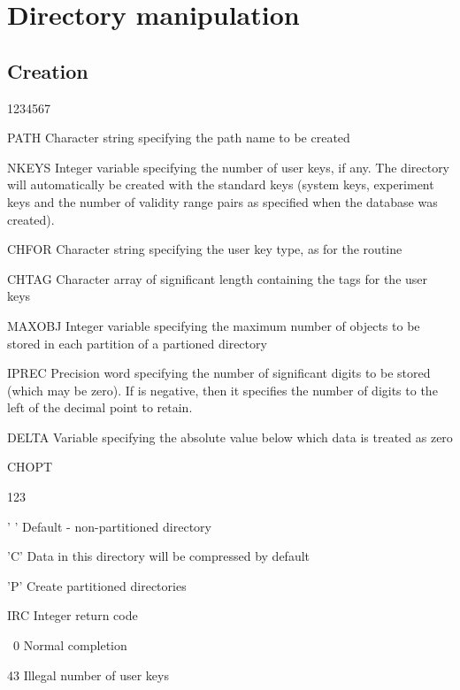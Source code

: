 \section{Directory manipulation}

\subsection{Creation}


\begin{DLtt}{1234567}
\item[PATH]Character string specifying the path name
  to be created
\item[NKEYS]Integer variable specifying the number of user
  keys, if any. The directory will automatically be created
  with the standard keys (system keys, experiment keys and
  the number of validity range pairs as specified when the
  database was created).
\item[CHFOR]Character string specifying the user key type,
  as for the routine 
\item[CHTAG]Character array of significant length  containing
  the tags for the user keys
\item[MAXOBJ]Integer variable specifying the maximum number of
  objects to be stored in each partition of a partioned directory
\item[IPREC]Precision word specifying the number of significant
  digits to be stored (which may be zero). If  is negative,
  then it specifies the number of digits to the left of the
  decimal point to retain.
\item[DELTA]Variable specifying the absolute value below which
  data is treated as zero
\item[CHOPT]
  \begin{DLtt}{123}
    \item[' ']Default - non-partitioned directory
    \item['C']Data in this directory will be compressed by default
    \item['P']Create partitioned directories
  \end{DLtt}
\item[IRC]Integer return code
  \begin{DLtt}{12}
    \item[\ 0]Normal completion
    \item[43]Illegal number of user keys
  \end{DLtt}
\end{DLtt}

